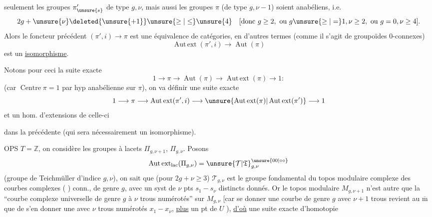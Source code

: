 seulement les groupes \(\pi'_{\unsure{s}}\) de type \(g,\nu\), mais aussi les groupes \(\pi\) (de type \(g,\nu-1\)) soient anabéliens, i.e.
\[
2g+\unsure{\nu}\deleted{\unsure{+1}}\unsure{\ge|\le}\unsure{4}
\quad
[\text{donc }g\ge2,\ \text{ou }g\unsure{\ge|=}1,\nu\ge2,\ \text{ou }g=0,\nu\ge4].
\]
Alors le foncteur précédent \((\pi',i)\longrightarrow\pi\) est une équivalence de catégories, en d'autres termes (comme il s'agit de groupoïdes \(0\)-connexes)
\[
\operatorname{Aut\,ext}(\pi',i)\longrightarrow\operatorname{Aut}(\pi)
\]
est un \uline{isomorphisme}.

Notons pour ceci  la suite exacte
\[
1\longrightarrow\pi\longrightarrow\operatorname{Aut}(\pi)
\longrightarrow\operatorname{Aut\,ext}(\pi)\longrightarrow1:
\]
(car \(\operatorname{Centre}\pi=1\) par hyp anabélienne sur \(\pi\)),  on va définir une suite exacte
\[
1\longrightarrow\pi\longrightarrow\operatorname{Aut\,ext}(\pi',i)
\longrightarrow\unsure{\operatorname{Aut\,ext}(\pi)|\operatorname{Aut\,ext}(\pi')}
\longrightarrow1
\]
et un hom. d'extensions de celle-ci

dans la précédente (qui sera nécessairement un isomorphisme).

OPS \(T=\mathbb Z\), on considère les groupes à lacets  \(\Pi_{g,\nu+1}\), \(\Pi_{g,\nu}\). Posons
\[
\operatorname{Aut\,ext}_{\mathrm{lac}}(\Pi_{g,\nu})
=\unsure{\mathcal T|\mathfrak T}_{g,\nu}^{\unsure{00|\circ\circ}}
\]
(groupe de Teichmüller d'indice \(g,\nu\)),
on sait que (pour \(2g+\nu\ge3\)) \(\mathcal T_{g,\nu}\) est le groupe fondamental du topos modulaire complexe  des courbes complexes ( ) conn., de genre \(g\), avec un syst de \(\nu\) pts \(s_1-\!s_\nu\) distincts donnés.
Or le topos modulaire \(M_{g,\nu+1}\) n'est autre que  la ``courbe complexe universelle  de genre \(g\) à \(\nu\) trous numérotés'' sur \(M_{g,\nu}\)
[car se donner une courbe  de genre \(g\) avec \(\nu+1\) trous  revient au \(\overline{\mathrm m}\) que de s'en donner une  avec \(\nu\) trous numérotés \(x_1-\!x_\nu\), \uline{plus} un  pt de \(U\) ), \uline{d'où} une suite exacte d'homotopie

